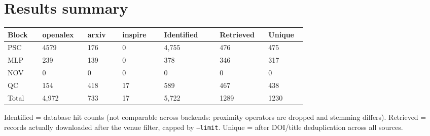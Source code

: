 \documentclass[10pt,a4paper]{article}
\begin{document}
\section*{Results summary}
{\scriptsize\begin{longtable}{p{0.103\linewidth}p{0.137\linewidth}p{0.103\linewidth}p{0.126\linewidth}p{0.160\linewidth}p{0.149\linewidth}p{0.114\linewidth}}
\hline
\textbf{Block} & \textbf{openalex} & \textbf{arxiv} & \textbf{inspire} & \textbf{Identified} & \textbf{Retrieved} & \textbf{Unique} \\ \hline
\endhead
PSC & 4579 & 176 & 0 & 4,755 & 476 & 475 \\
MLP & 239 & 139 & 0 & 378 & 346 & 317 \\
NOV & 0 & 0 & 0 & 0 & 0 & 0 \\
QC & 154 & 418 & 17 & 589 & 467 & 438 \\
Total & 4,972 & 733 & 17 & 5,722 & 1289 & 1230 \\
\hline
\end{longtable}}
Identified = database hit counts (not comparable across backends: proximity operators are dropped and stemming differs). Retrieved = records actually downloaded after the venue filter, capped by \texttt{--limit}. Unique = after DOI/title deduplication across all sources.
\end{document}
